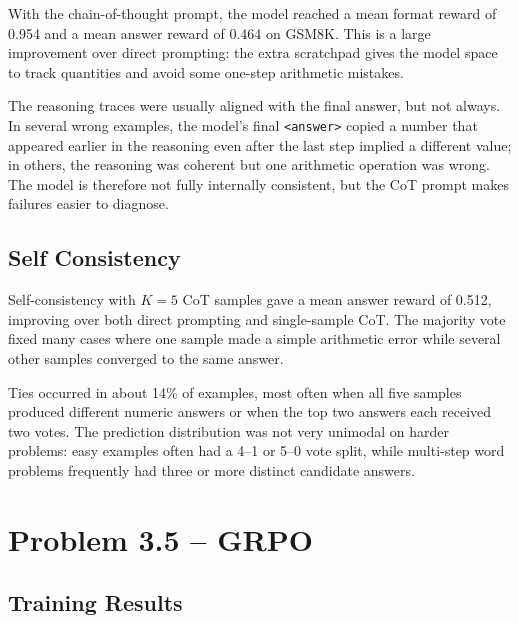 \documentclass[11pt]{article}
\begin{document}
With the chain-of-thought prompt, the model reached a mean format reward of 0.954 and a mean answer reward of 0.464 on GSM8K. This is a large improvement over direct prompting: the extra scratchpad gives the model space to track quantities and avoid some one-step arithmetic mistakes.

The reasoning traces were usually aligned with the final answer, but not always. In several wrong examples, the model's final \texttt{<answer>} copied a number that appeared earlier in the reasoning even after the last step implied a different value; in others, the reasoning was coherent but one arithmetic operation was wrong. The model is therefore not fully internally consistent, but the CoT prompt makes failures easier to diagnose.

\subsection*{Self Consistency}

Self-consistency with $K=5$ CoT samples gave a mean answer reward of 0.512, improving over both direct prompting and single-sample CoT. The majority vote fixed many cases where one sample made a simple arithmetic error while several other samples converged to the same answer.

Ties occurred in about 14\% of examples, most often when all five samples produced different numeric answers or when the top two answers each received two votes. The prediction distribution was not very unimodal on harder problems: easy examples often had a 4--1 or 5--0 vote split, while multi-step word problems frequently had three or more distinct candidate answers.


\section{Problem 3.5 -- GRPO}

\subsection*{Training Results}
\end{document}
